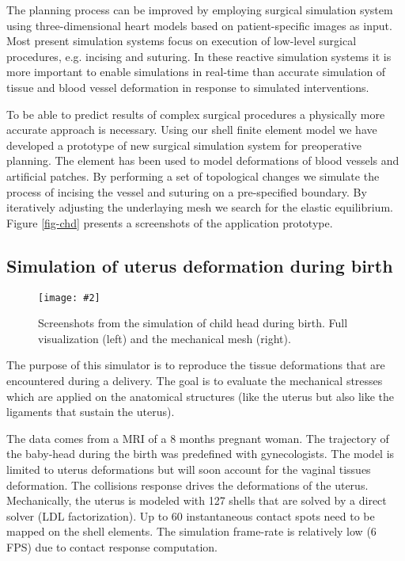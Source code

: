 \documentclass{egpubl}
\newcommand{\FigureW}[3]{%
\begin{figure*}[htb]
  \centering
  \texttt{[image: \#2]}
  \caption{\label{fig-#2}#3}
\end{figure*}}
\begin{document}
The planning process can be improved by employing surgical simulation system
using three-dimensional heart models based on patient-specific images as input.
Most present simulation systems focus on execution of low-level surgical
procedures, e.g. incising and suturing. In these reactive simulation systems it
is more important to enable simulations in real-time than accurate simulation
of tissue and blood vessel deformation in response to simulated interventions.

To be able to predict results of complex surgical procedures a physically more
accurate approach is necessary. Using our shell finite element model we have
developed a prototype \cite{Kislinskiy2012} of new surgical simulation system
for preoperative planning. The element has been used to model deformations of
blood vessels and artificial patches. By performing a set of topological changes
we simulate the process of incising the vessel and suturing on a pre-specified
boundary. By iteratively adjusting the underlaying mesh we search for the
elastic equilibrium. Figure \ref{fig-chd} presents a screenshots of the
application prototype.

%
%




\subsection{Simulation of uterus deformation during birth}

\FigureW{\linewidth}{birth}
{Screenshots from the simulation of child head during birth. Full visualization (left) and the mechanical mesh (right).}

The purpose of this simulator is to reproduce the tissue deformations that are encountered during a delivery.
The goal is to evaluate the mechanical stresses which are applied on the anatomical structures (like the uterus but also like the ligaments that sustain the uterus).

The data comes from a MRI of a 8 months pregnant woman. 
The trajectory of the baby-head during the birth was predefined with gynecologists. 
The model is limited to uterus deformations but will soon account for the vaginal tissues deformation.
The collisions response drives the deformations of the uterus.
Mechanically, the uterus is modeled with 127 shells that are solved by a direct solver (LDL factorization).
Up to 60 instantaneous contact spots need to be mapped on the shell elements. 
The simulation frame-rate is relatively low (6 FPS) due to contact response computation.
\end{document}
